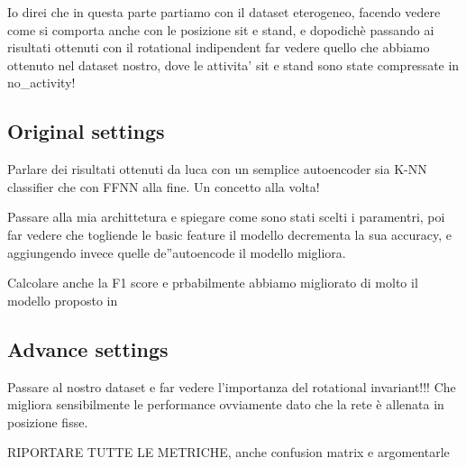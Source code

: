 Io direi che in questa parte partiamo con il dataset eterogeneo, facendo vedere come si comporta anche con le posizione sit e stand, e dopodichè passando ai risultati ottenuti con il rotational indipendent far vedere quello che abbiamo ottenuto nel dataset nostro, dove le attivita' sit e stand sono state compressate in no\_activity!

\subsection{Original settings}

Parlare dei risultati ottenuti da luca con un semplice autoencoder sia K-NN classifier che con FFNN alla fine. Un concetto alla volta!

Passare alla mia archittetura e spiegare come sono stati scelti i paramentri, poi far vedere che togliende le basic feature il modello decrementa la sua accuracy, e aggiungendo invece quelle de''autoencode il modello migliora. 

Calcolare anche la F1 score e prbabilmente abbiamo migliorato di molto il modello proposto in \cite{blunck2013heterogeneity}

\subsection{Advance settings}
Passare al nostro dataset e far vedere l'importanza del rotational invariant!!! Che migliora sensibilmente le performance ovviamente dato che la rete è allenata in posizione fisse.

RIPORTARE TUTTE LE METRICHE, anche confusion matrix e argomentarle
